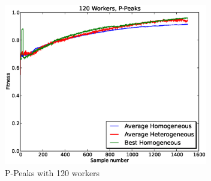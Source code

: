 \documentclass{sig-alternate}
\begin{document}
\begin{figure}[t]
\centering
\includegraphics[width=3.5in]{eps/PPeaks-w120.eps}
\caption{  P-Peaks with 120 workers}
\label{fig:PPeaks-w120}
\end{figure}
\end{document}
